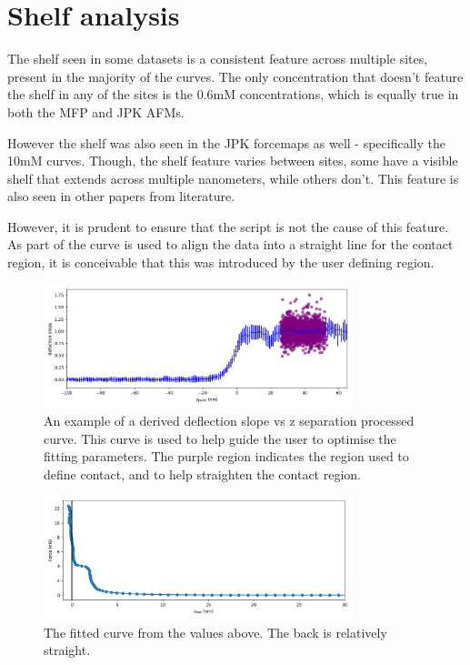 \section{Shelf analysis}

The shelf seen in some datasets is a consistent feature across multiple sites, present in the majority of the curves. The only concentration that doesn't feature the shelf in any of the sites is the 0.6mM concentrations, which is equally true in both the MFP and JPK AFMs.

However the shelf was also seen in the JPK forcemaps as well - specifically the 10mM curves. Though, the shelf feature varies between sites, some have a visible shelf that extends across multiple nanometers, while others don't. This feature is also seen in other papers from literature.\cite{guleryuz2012afm}

However, it is prudent to ensure that the script is not the cause of this feature. As part of the curve is used to align the data into a straight line for the contact region, it is conceivable that this was introduced by the user defining region.

\begin{figure}[h!]
\centering
\includegraphics[width=0.8\textwidth]{chapter8/Shelf/Post 1.6 S4 df_deriv_bin.jpg}
\caption{An example of a derived deflection slope vs z separation processed curve. This curve is used to help guide the user to optimise the fitting parameters. The purple region indicates the region used to define contact, and to help straighten the contact region.}
\label{fig:Deriv1}
\end{figure}
\begin{figure}[h!]
\centering
\includegraphics[width=0.8\textwidth]{chapter8/Shelf/Post approach_force_sep.jpg}
\caption{The fitted curve from the values above. The back is relatively straight.}
\label{fig:CurveBack}
\end{figure}

